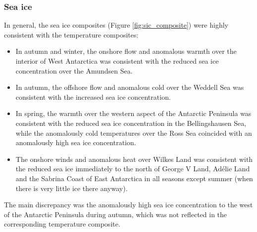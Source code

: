 \subsubsection{Sea ice}

In general, the sea ice composites (Figure \ref{fig:sic_composite}) were highly consistent with the temperature composites: 
\begin{itemize}
\item In autumn and winter, the onshore flow and anomalous warmth over the interior of West Antarctica was consistent with the reduced sea ice concentration over the Amundsen Sea. 
\item In autumn, the offshore flow and anomalous cold over the Weddell Sea was consistent with the increased sea ice concentration. 
\item In spring, the warmth over the western aspect of the Antarctic Peninsula was consistent with the reduced sea ice concentration in the Bellingshausen Sea, while the anomalously cold temperatures over the Ross Sea coincided with an anomalously high sea ice concentration.
\item The onshore winds and anomalous heat over Wilkes Land was consistent with the reduced sea ice immediately to the north of George V Land, Ad{\'e}lie Land and the Sabrina Coast of East Antarctica in all seasons except summer (when there is very little ice there anyway).
\end{itemize}

The main discrepancy was the anomalously high sea ice concentration to the west of the Antarctic Peninsula during autumn, which was not reflected in the corresponding temperature composite.